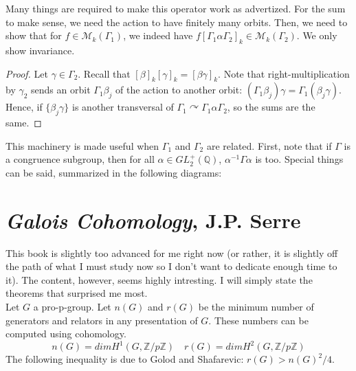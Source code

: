 \documentclass[11pt]{article}
\theoremstyle{definition}
\theoremstyle{example}
\theoremstyle{lemma}
\theoremstyle{proposition}
\theoremstyle{theorem}
\begin{document}
Many things are required to make this operator work as advertized. For the sum to make sense, we need the action to have finitely many orbits. Then, we need to show that for $f\in\mathcal{M}_k(\Gamma_1)$, we indeed have $ f[\Gamma_1\alpha\Gamma_2]_k\in \mathcal{M}_k(\Gamma_2)$. We only show invariance.\\
\begin{proof}
Let $\gamma\in \Gamma_2$. Recall that $[\beta]_k[\gamma]_k = [\beta\gamma]_k$. 
Note that right-multiplication by $\gamma_2$ sends an orbit $\Gamma_1\beta_j$ of the action to another orbit: $(\Gamma_1\beta_j)\gamma= \Gamma_1(\beta_j\gamma)$. Hence, if $\{\beta_j \gamma\}$ is another transversal of $\Gamma_1\curvearrowright\Gamma_1\alpha\Gamma_2$, so the sums are the same.
\end{proof}

This machinery is made useful when $\Gamma_1$ and $\Gamma_2$ are related. First, note that if $\Gamma$ is a congruence subgroup, then for all $\alpha\in GL_2^+(\mathbb{Q})$,  $\alpha^{-1}\Gamma\alpha$ is too. Special things can be said, summarized in the following diagrams:

















\section{\textit{Galois Cohomology}, J.P. Serre}
This book is slightly too advanced for me right now (or rather, it is slightly off the path of what I must study now so I don't want to dedicate enough time to it). The content, however, seems highly intresting. I will simply state the theorems that surprised me most.\\
Let $G$ a pro-p-group. Let $n(G)$ and $r(G)$ be the minimum number of generators and relators in any presentation of $G$. These numbers can be computed using cohomology.
$$n(G) = dim H^1(G, \mathbb{Z}/p\mathbb{Z}) \quad r(G) = dim H^2(G, \mathbb{Z}/p\mathbb{Z}) $$
The following inequality is due to Golod and Shafarevic: $r(G) > n(G)^2/4$.
\end{document}
